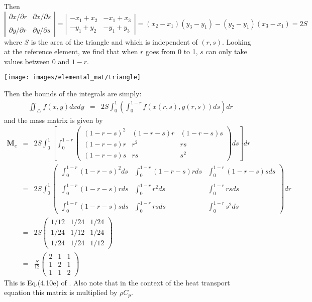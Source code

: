 Then 
\[
\left| 
\begin{array}{cc}
\partial x/\partial r & \partial x/\partial s \\ \\
\partial y/\partial r & \partial y/\partial s 
\end{array}
\right|  
=
\left| 
\begin{array}{cc}
- x_1+ x_2 & - x_1+ x_3 \\
- y_1+ y_2 & - y_1+ y_3 
\end{array}
\right|  
=
(x_2-x_1)(y_3-y_1)-(y_2-y_1)(x_3-x_1)
= 2S
\]
where $S$ is the area of the triangle and which is independent of $(r,s)$.
Looking at the reference element, we find that when $r$ goes from 0 to 1, 
$s$ can only take values between 0 and $1-r$.
\begin{center}
\texttt{[image: images/elemental\_mat/triangle]}
\end{center}
Then the bounds of the integrals are simply: 
\begin{eqnarray}
\iint_\triangle f(x,y) dx dy &=& 2S \int_0^{1} \left(\int_0^{1-r} f(x(r,s),y(r,s))  ds \right) dr 
\end{eqnarray}
and the mass matrix is given by
\begin{eqnarray}
{\bm M}_e 
&=& 2S \int_{0}^1 \left[ \int_{0}^{1-r}
\left(
\begin{array}{ccc}
(1-r-s)^2 & (1-r-s)r & (1-r-s)s \\
(1-r-s)r & r^2 & rs \\
(1-r-s)s & rs & s^2 
\end{array}
\right)
 ds \right] dr \\
&=& 
2S \int_{0}^1 
\left(
\begin{array}{ccc}
\int_0^{1-r} (1-r-s)^2 ds &\int_0^{1-r} (1-r-s)r ds& \int_0^{1-r} (1-r-s)s ds \\ \\
\int_0^{1-r} (1-r-s)r ds  &\int_0^{1-r} r^2 ds     & \int_0^{1-r} rs ds \\ \\
\int_0^{1-r} (1-r-s)s ds  &\int_0^{1-r} rs ds      & \int_0^{1-r} s^2 ds
\end{array}
\right)
 dr \\
&=& 
2S
\left(
\begin{array}{ccc}
1/12 & 1/24 & 1/24 \\
1/24 & 1/12 & 1/24 \\
1/24 & 1/24 & 1/12
\end{array}
\right)
\\
&=&
\frac{S}{12}
\left(
\begin{array}{ccc}
2 & 1 & 1 \\
1 & 2 & 1 \\
1 & 1 & 2
\end{array}
\right)
\end{eqnarray}
This is Eq.(4.10e) of \textcite{li06}. 
Also note that in the context of the heat transport equation this matrix is multiplied 
by $\rho C_p$.

